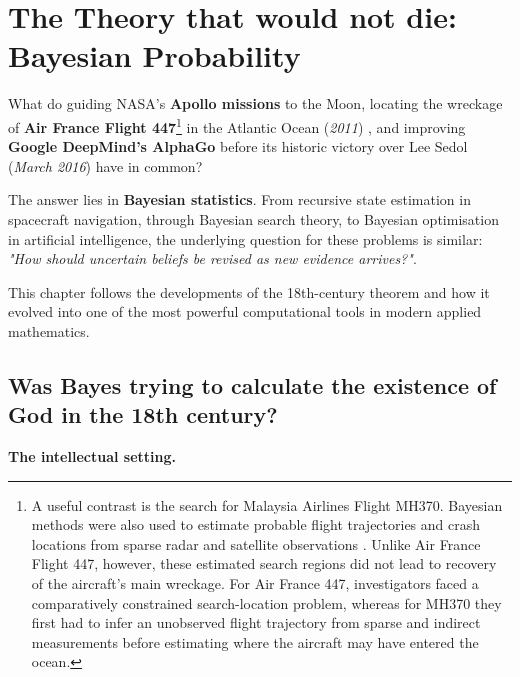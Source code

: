 \section{The Theory that would not die: Bayesian Probability}\label{sec:bayes}


\noindent
What do guiding NASA's \textbf{Apollo missions} to the Moon, locating the wreckage of \textbf{Air France Flight 447}\footnote{
A useful contrast is the search for Malaysia Airlines Flight MH370. Bayesian methods were also used to estimate probable flight trajectories and crash locations from sparse radar and satellite observations \cite{davey2016bayesian}. Unlike Air France Flight 447, however, these estimated search regions did not lead to recovery of the aircraft's main wreckage. For Air France 447, investigators faced a comparatively constrained search-location problem, whereas for MH370 they first had to infer an unobserved flight trajectory from sparse and indirect measurements before estimating where the aircraft may have entered the ocean.
} in the Atlantic Ocean (\textit{2011}) \cite{stone2014search, cornell2015bayes}, and improving \textbf{Google DeepMind's AlphaGo} before its historic victory over Lee Sedol (\textit{March 2016}) \cite{silver2016mastering} have in common?

\vspace{0.2em}

The answer lies in \textbf{Bayesian statistics}. From recursive state estimation in spacecraft navigation, through Bayesian search theory, to Bayesian optimisation in artificial intelligence, the underlying question for these problems is similar: \textit{"How should uncertain beliefs be revised as new evidence arrives?"}. 

\vspace{0.4em}

This chapter follows the developments of the 18th-century theorem and how it evolved into one of the most powerful computational tools in modern applied mathematics.

\subsection{Was Bayes trying to calculate the existence of God in the 18th century?}

\noindent\textbf{The intellectual setting.}

\vspace{0.4em}

